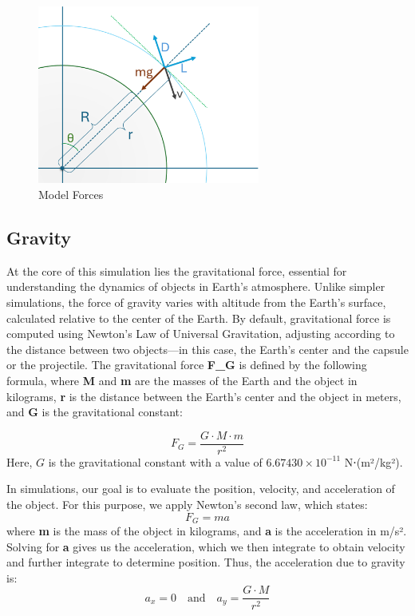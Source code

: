 \documentclass[runningheads]{llncs}
\begin{document}
\begin{figure}
\centering
\includegraphics[width=0.65\textwidth]{images/model_forces.png}
\caption{Model Forces} \label{model_forces}
\end{figure}



\subsection{Gravity}
At the core of this simulation lies the gravitational force, essential for understanding the dynamics of objects in Earth's atmosphere. Unlike simpler simulations, the force of gravity varies with altitude from the Earth's surface, calculated relative to the center of the Earth. By default, gravitational force is computed using Newton's Law of Universal Gravitation, adjusting according to the distance between two objects—in this case, the Earth's center and the capsule or the projectile. The gravitational force \textbf{F\_G} is defined by the following formula, where \textbf{M} and \textbf{m} are the masses of the Earth and the object in kilograms, \textbf{r} is the distance between the Earth's center and the object in meters, and \textbf{G} is the gravitational constant:

\begin{equation}
F_G = \frac{G \cdot M \cdot m}{r^2}
\end{equation}
Here, \( G \) is the gravitational constant with a value of \( 6.67430 \times 10^{-11} \) N⋅(m²/kg²).

In simulations, our goal is to evaluate the position, velocity, and acceleration of the object. For this purpose, we apply Newton's second law, which states:
\begin{equation}
F_G = ma
\end{equation}
where \textbf{m} is the mass of the object in kilograms, and \textbf{a} is the acceleration in m/s². Solving for \textbf{a} gives us the acceleration, which we then integrate to obtain velocity and further integrate to determine position.
Thus, the acceleration due to gravity  is:
\begin{equation}
a_x = 0 \quad \text{and} \quad a_y = \frac{G \cdot M}{r^2}
\end{equation}
\end{document}
